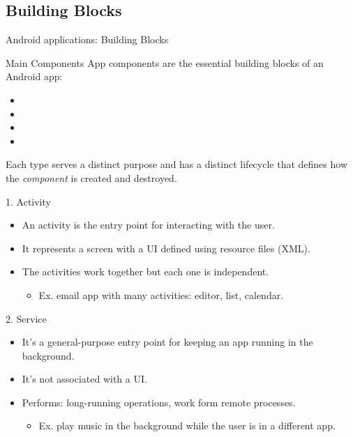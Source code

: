 \documentclass{beamer}
\begin{document}
\subsection{Building Blocks}

\begin{frame}[allowframebreaks]{Android applications: Building Blocks}
  \begin{block}{Main Components}
    App components are the essential building blocks of an Android app:
    \begin{itemize}
      \item {}
      \item {}
      \item {}
      \item {}
    \end{itemize}
    Each type serves a distinct purpose and has a distinct lifecycle that defines how the \textit{component} is created and destroyed.
  \end{block}
  \newpage
  \begin{block}{1. Activity}
    \begin{itemize}
      \item An activity is the entry point for interacting with the user.
      \item It represents a screen with a UI defined using resource files (XML).
      \item The activities work together but each one is independent.
      \begin{itemize}
        \item  Ex. email app with many activities: editor, list, calendar.
      \end{itemize}
    \end{itemize}
  \end{block}

  \begin{block}{2. Service}
  \begin{itemize}
    \item It's a general-purpose entry point for keeping an app running in the background.
    \item It's not associated with a UI.
    \item Performs: long-running operations, work form remote processes.
    \begin{itemize}
      \item  Ex. play music in the background while the user is in a different app.
    \end{itemize}
  \end{itemize}
  \end{block}


\end{frame}
\end{document}
